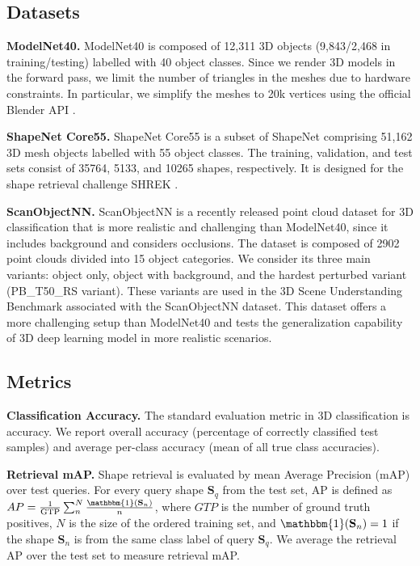 \documentclass[10pt,twocolumn,letterpaper]{article}
\newcommand{\mysection}[1]{\noindent\textbf{#1.}}
\begin{document}
\subsection{Datasets}
\vspace{-4pt}
\mysection{ModelNet40}
ModelNet40 \cite{modelnet} is composed of 12,311 3D objects (9,843/2,468 in training/testing) labelled with 40 object classes. Since we render 3D models in the forward pass, we limit the number of triangles in the meshes due to hardware constraints. 
In particular, we simplify the meshes to 20k vertices using the official Blender API \cite{blender,mesh-simplify}.

\mysection{ShapeNet Core55}
ShapeNet Core55 is a subset of ShapeNet \cite{shapenet} comprising 51,162 3D mesh objects labelled with 55 object classes. The training, validation, and test sets consist of 35764, 5133, and 10265 shapes, respectively. It is designed for the shape retrieval challenge SHREK \cite{shrek17}. 

\mysection{ScanObjectNN}
ScanObjectNN \cite{scanobjectnn} is a recently released point cloud dataset for 3D classification that is more realistic and challenging than ModelNet40, since it includes background and considers occlusions. The dataset is composed of 2902 point clouds divided into 15 object categories. We consider its three main variants: object only, object with background, and the hardest perturbed variant (PB\_T50\_RS variant). These variants are used in the 3D Scene Understanding Benchmark associated with the ScanObjectNN dataset.
This dataset offers a more challenging setup than ModelNet40 and tests the generalization capability of 3D deep learning model in more realistic scenarios.

\subsection{Metrics}
\vspace{-4pt}
\mysection{Classification Accuracy} 
The standard evaluation metric in 3D classification is accuracy. We report overall accuracy (percentage of correctly classified test samples) and average per-class accuracy (mean of all true class accuracies).

\mysection{Retrieval mAP} 
Shape retrieval is evaluated by mean Average Precision (mAP) over test queries. For every query shape $\mathbf{S}_q$ from the test set, AP is defined as $AP= \frac{1}{\text{GTP}} \sum_{n}^{N}\frac{\mathbbm{1}(\mathbf{S}_n)}{n} $, where $GTP$ is the number of ground truth positives, $N$ is the size of the ordered training set, and $\mathbbm{1}(\mathbf{S}_n) = 1$ if the shape $\mathbf{S}_n$ is from the same class label of query $\mathbf{S}_q$. We average the retrieval AP over the test set to measure retrieval mAP.
\end{document}

